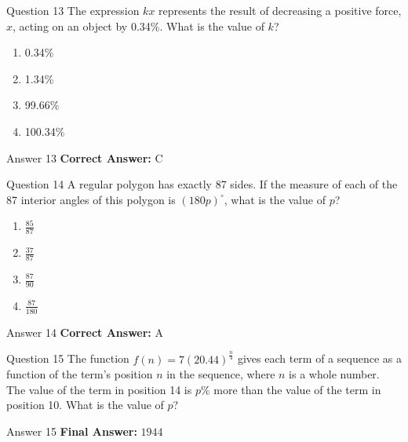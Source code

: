 \documentclass{beamer}
\begin{document}
\begin{frame}{Question 13}
\small
The expression \(kx\) represents the result of decreasing a positive force, \(x\), acting on an object by 0.34\%.
What is the value of \(k\)?
\vspace{0.35cm}
\begin{enumerate}
    \item[A.] 0.34\%
    \item[B.] 1.34\%
    \item[C.] 99.66\%
    \item[D.] 100.34\%
\end{enumerate}
\end{frame}
\begin{frame}{Answer 13}
\small
\textbf{Correct Answer:} C
\end{frame}

\begin{frame}{Question 14}
\small
A regular polygon has exactly 87 sides.
If the measure of each of the 87 interior angles of this polygon is \((180p)^\circ\), what is the value of \(p\)?
\vspace{0.35cm}
\begin{enumerate}
    \item[A.] \(\frac{85}{87}\)
    \item[B.] \(\frac{37}{87}\)
    \item[C.] \(\frac{87}{90}\)
    \item[D.] \(\frac{87}{180}\)
\end{enumerate}
\end{frame}
\begin{frame}{Answer 14}
\small
\textbf{Correct Answer:} A
\end{frame}

\begin{frame}{Question 15}
\small
The function \(f(n) = 7(20.44)^{\frac{n}{4}}\) gives each term of a sequence as a function of the term's position \(n\) in the sequence, where \(n\) is a whole number.
The value of the term in position 14 is \(p\%\) more than the value of the term in position 10.
What is the value of \(p\)?
\end{frame}
\begin{frame}{Answer 15}
\small
\textbf{Final Answer:} $\boxed{1944}$
\end{frame}
\end{document}
